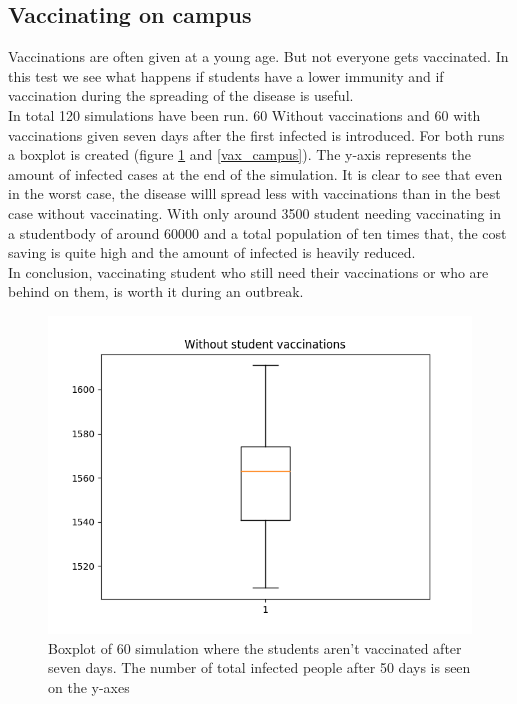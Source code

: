 \documentclass[runningheads]{llncs}
\begin{document}
\subsection{Vaccinating on campus}
Vaccinations are often given at a young age. But not everyone gets vaccinated. In this test we see what happens if students have a lower immunity and if vaccination during the spreading of the disease is useful.\\
In total 120 simulations have been run. 60 Without vaccinations and 60 with vaccinations given seven days after the first infected is introduced. For both runs a boxplot is created  (figure \ref{no_vax_campus} and \ref{vax_campus}). The y-axis represents the amount of infected cases at the end of the simulation. It is clear to see that even in the worst case, the disease willl spread less with vaccinations than in the best case without vaccinating. With only around 3500 student needing vaccinating in a studentbody of around 60000 and a total population of ten times that, the cost saving is quite high and the amount of infected is heavily reduced.\\
In conclusion, vaccinating student who still need their vaccinations or who are behind on them, is worth it during an outbreak. 
\begin{figure}[h!]
	\includegraphics[width=\textwidth]{vax_campus_1.png}
	\caption{Boxplot of 60 simulation where the students aren't vaccinated after seven days. The number of total infected people after 50 days is seen on the y-axes}
	\label{no_vax_campus}
\end{figure}
\end{document}
